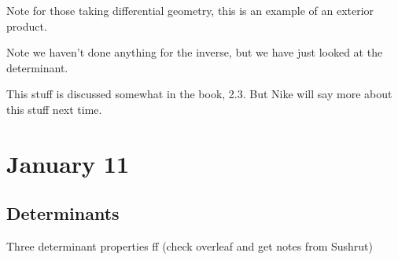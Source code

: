 \documentclass{article}
\theoremstyle{plain}
\theoremstyle{remark}
\begin{document}
Note for those taking differential geometry,
this is an example of an exterior product.

Note we haven't done anything for the inverse, but we have just looked at the determinant.

This stuff is discussed somewhat in the book, 2.3.
But Nike will say more about this stuff next time.

\section{January 11}
\subsection{Determinants}
Three determinant properties ff (check overleaf and get notes from Sushrut)
\end{document}
